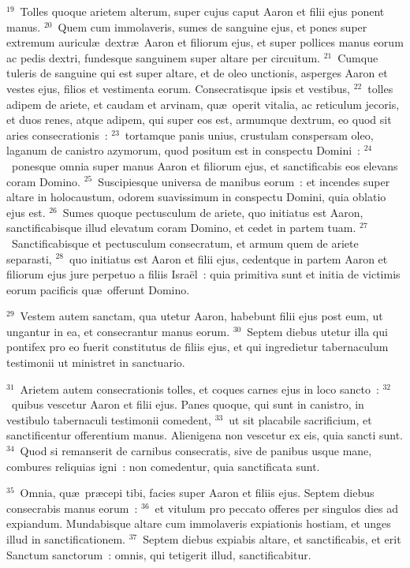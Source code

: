 ${}^{19}$~Tolles quoque arietem alterum, super cujus caput Aaron et filii ejus ponent manus.
${}^{20}$~Quem cum immolaveris, sumes de sanguine ejus, et pones super extremum auricul\ae\ dextr\ae\ Aaron et filiorum ejus, et super pollices manus eorum ac pedis dextri, fundesque sanguinem super altare per circuitum.
${}^{21}$~Cumque tuleris de sanguine qui est super altare, et de oleo unctionis, asperges Aaron et vestes ejus, filios et vestimenta eorum. Consecratisque ipsis et vestibus,
${}^{22}$~tolles adipem de ariete, et caudam et arvinam, qu\ae\ operit vitalia, ac reticulum jecoris, et duos renes, atque adipem, qui super eos est, armumque dextrum, eo quod sit aries consecrationis~:
${}^{23}$~tortamque panis unius, crustulam conspersam oleo, laganum de canistro azymorum, quod positum est in conspectu Domini~:
${}^{24}$~ponesque omnia super manus Aaron et filiorum ejus, et sanctificabis eos elevans coram Domino.
${}^{25}$~Suscipiesque universa de manibus eorum~: et incendes super altare in holocaustum, odorem suavissimum in conspectu Domini, quia oblatio ejus est.
${}^{26}$~Sumes quoque pectusculum de ariete, quo initiatus est Aaron, sanctificabisque illud elevatum coram Domino, et cedet in partem tuam.
${}^{27}$~Sanctificabisque et pectusculum consecratum, et armum quem de ariete separasti,
${}^{28}$~quo initiatus est Aaron et filii ejus, cedentque in partem Aaron et filiorum ejus jure perpetuo a filiis Isra\"el~: quia primitiva sunt et initia de victimis eorum pacificis qu\ae\ offerunt Domino.


${}^{29}$~Vestem autem sanctam, qua utetur Aaron, habebunt filii ejus post eum, ut ungantur in ea, et consecrantur manus eorum.
${}^{30}$~Septem diebus utetur illa qui pontifex pro eo fuerit constitutus de filiis ejus, et qui ingredietur tabernaculum testimonii ut ministret in sanctuario.


${}^{31}$~Arietem autem consecrationis tolles, et coques carnes ejus in loco sancto~:
${}^{32}$~quibus vescetur Aaron et filii ejus. Panes quoque, qui sunt in canistro, in vestibulo tabernaculi testimonii comedent,
${}^{33}$~ut sit placabile sacrificium, et sanctificentur offerentium manus. Alienigena non vescetur ex eis, quia sancti sunt.
${}^{34}$~Quod si remanserit de carnibus consecratis, sive de panibus usque mane, combures reliquias igni~: non comedentur, quia sanctificata sunt.


${}^{35}$~Omnia, qu\ae\ pr\ae cepi tibi, facies super Aaron et filiis ejus. Septem diebus consecrabis manus eorum~:
${}^{36}$~et vitulum pro peccato offeres per singulos dies ad expiandum. Mundabisque altare cum immolaveris expiationis hostiam, et unges illud in sanctificationem.
${}^{37}$~Septem diebus expiabis altare, et sanctificabis, et erit Sanctum sanctorum~: omnis, qui tetigerit illud, sanctificabitur.


